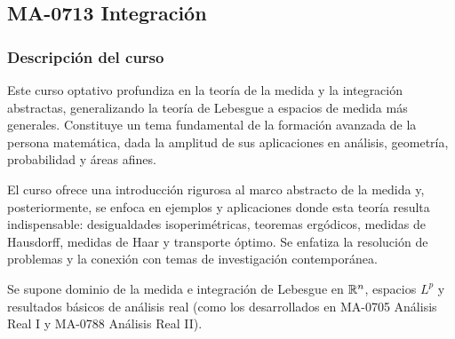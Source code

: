\newpage
\subsection*{MA-0713 Integración}

\hypertarget{MA0713}{}
\begin{refsection}
\begin{table}[H]
\end{table}

\subsubsection*{Descripción del curso}

Este curso optativo profundiza en la teoría de la medida y la integración abstractas, generalizando la teoría de Lebesgue a espacios de medida más generales. Constituye un tema fundamental de la formación avanzada de la persona matemática, dada la amplitud de sus aplicaciones en análisis, geometría, probabilidad y áreas afines.

El curso ofrece una introducción rigurosa al marco abstracto de la medida y, posteriormente, se enfoca en ejemplos y aplicaciones donde esta teoría resulta indispensable: desigualdades isoperimétricas, teoremas ergódicos, medidas de Hausdorff, medidas de Haar y transporte óptimo. Se enfatiza la resolución de problemas y la conexión con temas de investigación contemporánea.

Se supone dominio de la medida e integración de Lebesgue en $\mathbb{R}^n$, espacios $L^p$ y resultados básicos de análisis real (como los desarrollados en MA-0705 Análisis Real I y MA-0788 Análisis Real II).


\end{refsection}
